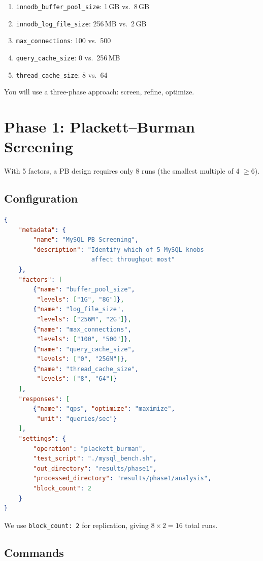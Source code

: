 \documentclass[11pt]{book}
\begin{document}
\begin{enumerate}[nosep]
  \item \texttt{innodb\_buffer\_pool\_size}: 1\,GB vs.\ 8\,GB
  \item \texttt{innodb\_log\_file\_size}: 256\,MB vs.\ 2\,GB
  \item \texttt{max\_connections}: 100 vs.\ 500
  \item \texttt{query\_cache\_size}: 0 vs.\ 256\,MB
  \item \texttt{thread\_cache\_size}: 8 vs.\ 64
\end{enumerate}

You will use a three-phase approach: screen, refine, optimize.

\section{Phase 1: Plackett--Burman Screening}

With 5 factors, a PB design requires only 8 runs (the smallest multiple of 4 $\geq 6$).

\subsection{Configuration}

\begin{lstlisting}[language=json]
{
    "metadata": {
        "name": "MySQL PB Screening",
        "description": "Identify which of 5 MySQL knobs
                        affect throughput most"
    },
    "factors": [
        {"name": "buffer_pool_size",
         "levels": ["1G", "8G"]},
        {"name": "log_file_size",
         "levels": ["256M", "2G"]},
        {"name": "max_connections",
         "levels": ["100", "500"]},
        {"name": "query_cache_size",
         "levels": ["0", "256M"]},
        {"name": "thread_cache_size",
         "levels": ["8", "64"]}
    ],
    "responses": [
        {"name": "qps", "optimize": "maximize",
         "unit": "queries/sec"}
    ],
    "settings": {
        "operation": "plackett_burman",
        "test_script": "./mysql_bench.sh",
        "out_directory": "results/phase1",
        "processed_directory": "results/phase1/analysis",
        "block_count": 2
    }
}
\end{lstlisting}

We use \texttt{block\_count: 2} for replication, giving $8 \times 2 = 16$ total runs.

\subsection{Commands}
\end{document}
